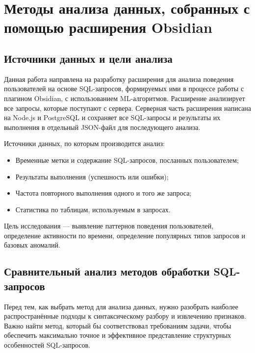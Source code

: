 \documentclass[14pt]{extarticle}
\begin{document}
\newpage
\section{ Методы анализа данных, собранных с помощью расширения Obsidian}

\subsection{Источники данных и цели анализа}

Данная работа направлена на разработку расширения для анализа поведения пользователей на основе SQL-запросов, формируемых ими в процессе работы с плагином Obsidian, с использованием ML-алгоритмов. Расширение анализирует все запросы, которые поступают с сервера. Серверная часть расширения написана на Node.js и PostgreSQL и сохраняет все SQL-запросы и результаты их выполнения в отдельный JSON-файл для последующего анализа.

Источники данных, по которым производится анализ:
\begin{itemize}
    \item Временные метки и содержание SQL-запросов, посланных пользователем;
    \item Результаты выполнения (успешность или ошибки);
    \item Частота повторного выполнения одного и того же запроса;
    \item Статистика по таблицам, используемым в запросах.
\end{itemize}

Цель исследования — выявление паттернов поведения пользователей, определение активности по времени, определение популярных типов запросов и базовых аномалий.

\subsection{Сравнительный анализ методов обработки SQL-запросов}

Перед тем, как выбрать метод для анализа данных, нужно разобрать наиболее распространённые подходы к синтаксическому разбору и извлечению признаков. Важно найти метод, который бы соответствовал требованиям задачи, чтобы обеспечить максимально точное и эффективное представление структурных особенностей SQL-запросов.
\end{document}

